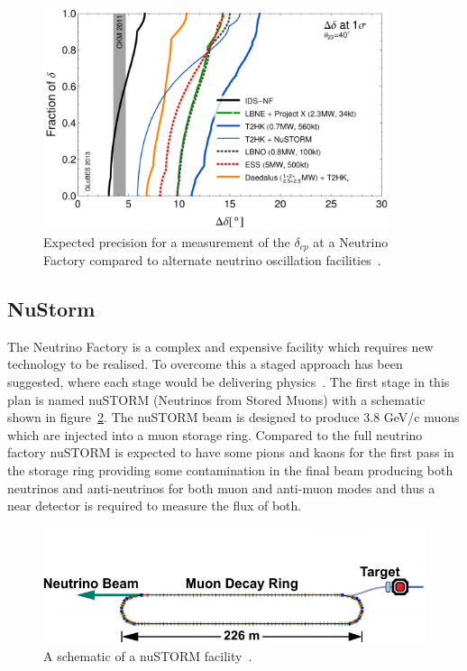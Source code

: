 \begin{figure}[h!]
\centering
\includegraphics[width=0.9\textwidth]{figures/rdr-cp-precision-comparison-131216.pdf}
\caption{Expected precision for a measurement of the $\delta_{cp}$ at a Neutrino Factory compared to alternate neutrino oscillation facilities~\cite{Fix7}.}
\label{fig:nuFactExp}
\end{figure}



\subsection{NuStorm}

The Neutrino Factory is a complex and expensive facility which requires new technology to be realised. To overcome this a staged approach has been suggested, where each stage would be delivering physics~\cite{Fix7}. The first stage in this plan is named nuSTORM (Neutrinos from Stored Muons) with a schematic shown in figure~\ref{fig:nuStorm}. The nuSTORM beam is designed to produce 3.8 GeV/c muons which are injected into a muon storage ring. Compared to the full neutrino factory nuSTORM is expected to have some pions and kaons for the first pass in the storage ring providing some contamination in the final beam producing both neutrinos and anti-neutrinos for both muon and anti-muon modes and thus a near detector is required to measure the flux of both. 

\begin{figure}[h!]
\centering
\includegraphics[width=\textwidth]{figures/nuSTORM_schematic.pdf}
\caption{A schematic of a nuSTORM facility~\cite{Fix7}.}
\label{fig:nuStorm}
\end{figure}

